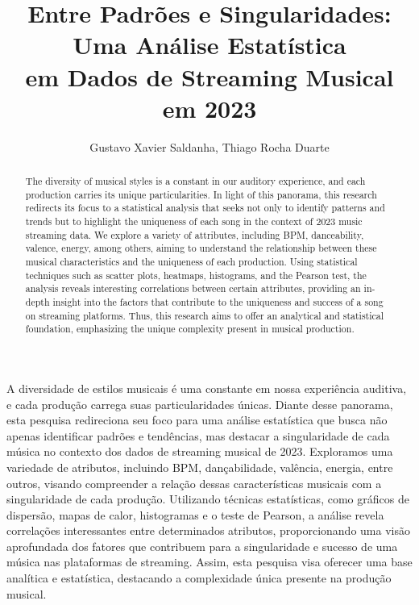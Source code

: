 \documentclass[12pt]{article}
\title{Entre Padrões e Singularidades: Uma Análise Estatística\\ em Dados de Streaming Musical em 2023}
\author{Gustavo Xavier Saldanha, Thiago Rocha Duarte}
\begin{document}
 

\maketitle

\begin{abstract}
  The diversity of musical styles is a constant in our auditory experience, and each production carries its unique particularities. In light of this panorama, this research redirects its focus to a statistical analysis that seeks not only to identify patterns and trends but to highlight the uniqueness of each song in the context of 2023 music streaming data. We explore a variety of attributes, including BPM, danceability, valence, energy, among others, aiming to understand the relationship between these musical characteristics and the uniqueness of each production. Using statistical techniques such as scatter plots, heatmaps, histograms, and the Pearson test, the analysis reveals interesting correlations between certain attributes, providing an in-depth insight into the factors that contribute to the uniqueness and success of a song on streaming platforms. Thus, this research aims to offer an analytical and statistical foundation, emphasizing the unique complexity present in musical production.\cite{silva2020}
\end{abstract}

     
\begin{resumo} 
  A diversidade de estilos musicais é uma constante em nossa experiência auditiva, e cada produção carrega suas particularidades únicas. Diante desse panorama, esta pesquisa redireciona seu foco para uma análise estatística que busca não apenas identificar padrões e tendências, mas destacar a singularidade de cada música no contexto dos dados de streaming musical de 2023. Exploramos uma variedade de atributos, incluindo BPM, dançabilidade, valência, energia, entre outros, visando compreender a relação dessas características musicais com a singularidade de cada produção. Utilizando técnicas estatísticas, como gráficos de dispersão, mapas de calor, histogramas e o teste de Pearson, a análise revela correlações interessantes entre determinados atributos, proporcionando uma visão aprofundada dos fatores que contribuem para a singularidade e sucesso de uma música nas plataformas de streaming. Assim, esta pesquisa visa oferecer uma base analítica e estatística, destacando a complexidade única presente na produção musical.
\end{resumo}
\end{document}
